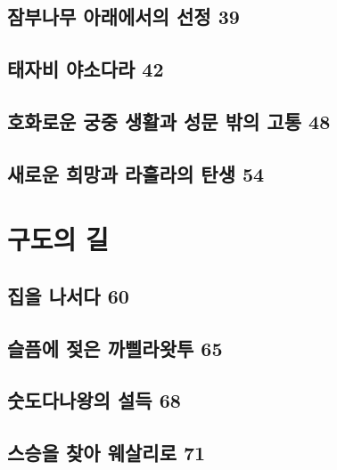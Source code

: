 \documentclass[12pt, a4paper, oneside]{book}
\let\stdsection\section
\renewcommand\section{\newpage\stdsection}
\begin{document}
	\section{잠부나무 아래에서의 선정 39 }

%
	\section{ 태자비 야소다라 42 }

%
	\section{호화로운 궁중 생활과 성문 밖의 고통 48 }

%
	\section{새로운 희망과 라훌라의 탄생 54}




	\chapter{구도의 길}
	\noptcrule
	\parttoc			


	\section{집을 나서다 60 }

	\section{슬픔에 젖은 까삘라왓투 65 }

	\section{숫도다나왕의 설득 68 }

	\section{스승을 찾아 웨살리로 71 }
\end{document}
